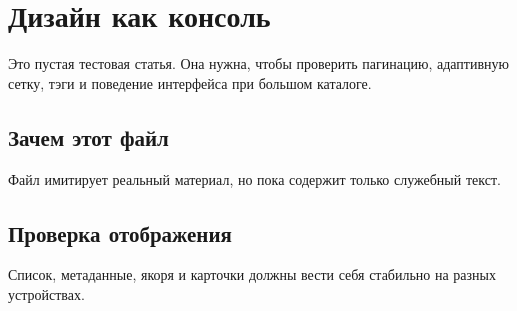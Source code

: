 \section{Дизайн как консоль}

Это пустая тестовая статья. Она нужна, чтобы проверить пагинацию, адаптивную сетку, тэги и поведение интерфейса при большом каталоге.

\subsection{Зачем этот файл}

Файл имитирует реальный материал, но пока содержит только служебный текст.

\subsection{Проверка отображения}

Список, метаданные, якоря и карточки должны вести себя стабильно на разных устройствах.
